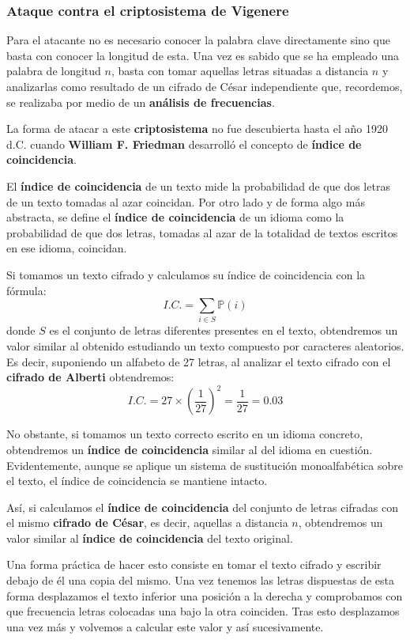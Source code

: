 \documentclass[nochap]{apuntesURJC}
\begin{document}
\subsubsection{Ataque contra el criptosistema de Vigenere}
Para el atacante no es necesario conocer la palabra clave directamente sino que basta con conocer la longitud de esta. Una vez es sabido que se ha empleado una palabra de longitud $n$, basta con tomar aquellas letras situadas a distancia $n$ y analizarlas como resultado de un cifrado de César independiente que, recordemos, se realizaba por medio de un \textbf{análisis de frecuencias}.

La forma de atacar a este \textbf{criptosistema} no fue descubierta hasta el año 1920 d.C. cuando \textbf{William F. Friedman} desarrolló el concepto de \textbf{índice de coincidencia}.

El \textbf{índice de coincidencia} de un texto mide la probabilidad de que dos letras de un texto tomadas al azar coincidan. Por otro lado y de forma algo más abstracta, se define el \textbf{índice de coincidencia} de un idioma como la probabilidad de que dos letras, tomadas al azar de la totalidad de textos escritos en ese idioma, coincidan.

Si tomamos un texto cifrado y calculamos su índice de coincidencia con la fórmula:
\[I.C. = \sum_{i \in S}\mathbb{P}(i)\]
donde $S$ es el conjunto de letras diferentes presentes en el texto, obtendremos un valor similar al obtenido estudiando un texto compuesto por caracteres aleatorios. Es decir, suponiendo un alfabeto de 27 letras, al analizar el texto cifrado con el \textbf{cifrado de Alberti} obtendremos:
\[I.C. = 27 \times \left(\frac{1}{27}\right)^2 = \frac{1}{27} = 0.03\]

No obstante, si tomamos un texto correcto escrito en un idioma concreto, obtendremos un \textbf{índice de coincidencia} similar al del idioma en cuestión. Evidentemente, aunque se aplique un sistema de sustitución monoalfabética sobre el texto, el índice de coincidencia se mantiene intacto.

Así, si calculamos el \textbf{índice de coincidencia} del conjunto de letras cifradas con el mismo \textbf{cifrado de César}, es decir, aquellas a distancia $n$, obtendremos un valor similar al \textbf{índice de coincidencia} del texto original.

Una forma práctica de hacer esto consiste en tomar el texto cifrado y escribir debajo de él una copia del mismo. Una vez tenemos las letras dispuestas de esta forma desplazamos el texto inferior una posición a la derecha y comprobamos con que frecuencia letras colocadas una bajo la otra coinciden. Tras esto desplazamos una vez más y volvemos a calcular este valor y así sucesivamente.
\end{document}
